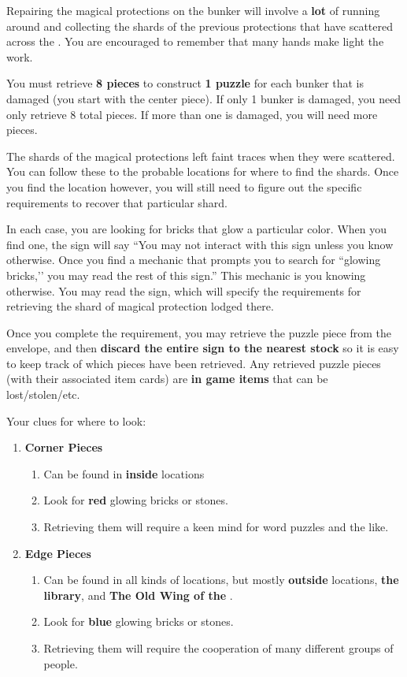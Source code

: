 \documentclass[green]{GL2020}
\begin{document}
\name{\gPhysicalLayer{}}

Repairing the magical protections on the bunker will involve a \textbf{lot} of running around and collecting the shards of the previous protections that have scattered across the \pSc{}. You are encouraged to remember that many hands make light the work.

You must retrieve \textbf{8 pieces} to construct \textbf{1 puzzle} for each bunker that is damaged (you start with the center piece). If only 1 bunker is damaged, you need only retrieve 8 total pieces. If more than one is damaged, you will need more pieces.

The shards of the magical protections left faint traces when they were scattered. You can follow these to the probable locations for where to find the shards. Once you find the location however, you will still need to figure out the specific requirements to recover that particular shard.

In each case, you are looking for bricks that glow a particular color. When you find one, the sign will say “You may not interact with this sign unless you know otherwise. Once you find a mechanic that prompts you to search for ``glowing bricks,’’ you may read the rest of this sign.” This mechanic is you knowing otherwise. You may read the sign, which will specify the requirements for retrieving the shard of magical protection lodged there.

Once you complete the requirement, you may retrieve the puzzle piece from the envelope, and then \textbf{discard the entire sign to the nearest stock} so it is easy to keep track of which pieces have been retrieved. Any retrieved puzzle pieces (with their associated item cards) are \textbf{in game items} that can be lost/stolen/etc.

Your clues for where to look:
\begin{enumerate}
  \item \textbf{Corner Pieces}
  \begin{enumerate}
    \item Can be found in \textbf{inside} locations
    \item Look for \textbf{red} glowing bricks or stones.
    \item Retrieving them will require a keen mind for word puzzles and the like.
  \end{enumerate}  
  \item \textbf{Edge Pieces}
  \begin{enumerate}
    \item Can be found in all kinds of locations, but mostly \textbf{outside} locations, \textbf{the library}, and \textbf{The Old Wing of the \pSc{}}.
    \item Look for \textbf{blue} glowing bricks or stones.
    \item Retrieving them will require the cooperation of many different groups of people.
  \end{enumerate}  
\end{enumerate}
\end{document}
